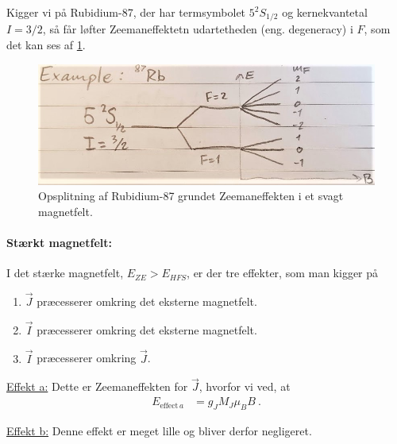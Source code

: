 Kigger vi på Rubidium-87, der har termsymbolet $5^2S_{1/2}$ og kernekvantetal $I = 3/2$, så får løfter Zeemaneffektetn udartetheden (eng. degeneracy) i $F$, som det kan ses af \cref{fig:Q17_RubidiumHyperFineZeemanSplittings}.
\begin{figure}[!h]
    \centering
    \includegraphics[width=.9\textwidth]{Q17/images/ZeemanEffectWithHyperFineStructureSplittingRubidium.jpg}
    \caption{Opsplitning af Rubidium-87 grundet Zeemaneffekten i et svagt magnetfelt.}
    \label{fig:Q17_RubidiumHyperFineZeemanSplittings}
\end{figure}


\paragraph{Stærkt magnetfelt:} I det stærke magnetfelt, $E_{ZE} > E_{HFS}$, er der tre effekter, som man kigger på
\begin{enumerate}[label=\alph*)]
    \item $\Vec{J}$ præcesserer omkring det eksterne magnetfelt.
    \item $\Vec{I}$ præcesserer omkring det eksterne magnetfelt.
    \item $\Vec{I}$ præcesserer omkring $\Vec{J}$.
\end{enumerate}

\noindent\underline{Effekt a:} Dette er Zeemaneffekten for $\Vec{J}$, hvorfor vi ved, at
\begin{align} \label{eq:Q17_EnergyFromEffectA}
    E_{\text{effect}\,a} &= g_J M_J \mu_B B \: .
\end{align}

\noindent\underline{Effekt b:} Denne effekt er meget lille og bliver derfor negligeret.

